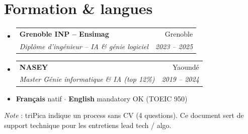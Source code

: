 \documentclass[a4paper,10.5pt]{article}
\makeatletter
\newcommand{\resumeSubheading}[4]{\vspace{4pt}\item\begin{tabular*}{0.97\textwidth}[t]{l@{\extracolsep{\fill}}r}\textbf{#1}&{#2}\\\textit{\small #3}&\textit{\small #4}\\\end{tabular*}\vspace{2pt}}
\newcommand{\resumeSubHeadingListStart}{\begin{itemize}[leftmargin=0.08in,label={}]}
\newcommand{\resumeSubHeadingListEnd}{\end{itemize}}
\makeatother
\begin{document}
\section{Formation \& langues}
\resumeSubHeadingListStart
  \resumeSubheading{Grenoble INP -- Ensimag}{Grenoble}{Dipl\^ome d'ing\'enieur -- IA \& g\'enie logiciel}{2023 -- 2025}
  \resumeSubheading{NASEY}{Yaound\'e}{Master G\'enie informatique \& IA (top 12\%)}{2019 -- 2024}
\resumeSubHeadingListEnd
\begin{itemize}[leftmargin=0.08in,label={}]\item \textbf{Fran\c{c}ais} natif $\cdot$ \textbf{English} mandatory OK (TOEIC 950)\end{itemize}

\vspace{6pt}
\small{\textit{Note} : triPica indique un process sans CV (4 questions). Ce document sert de support technique pour les entretiens lead tech / algo.}
\end{document}
